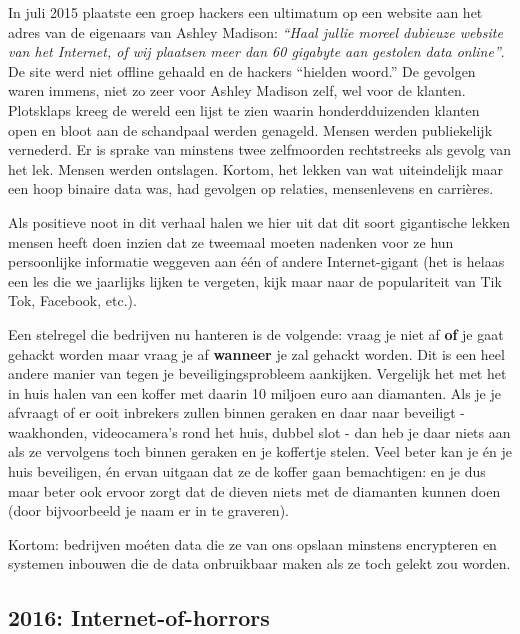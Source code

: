 \documentclass[
  10pt,
  dutch,
  paper=a4,
  ,captions=tableheading
]{scrbook}
\begin{document}
In juli 2015 plaatste een groep hackers een ultimatum op een website aan
het adres van de eigenaars van Ashley Madison: \emph{``Haal jullie
moreel dubieuze website van het Internet, of wij plaatsen meer dan 60
gigabyte aan gestolen data online''}. De site werd niet offline gehaald
en de hackers ``hielden woord.'' De gevolgen waren immens, niet zo zeer
voor Ashley Madison zelf, wel voor de klanten. Plotsklaps kreeg de
wereld een lijst te zien waarin honderdduizenden klanten open en bloot
aan de schandpaal werden genageld. Mensen werden publiekelijk vernederd.
Er is sprake van minstens twee zelfmoorden rechtstreeks als gevolg van
het lek. Mensen werden ontslagen. Kortom, het lekken van wat
uiteindelijk maar een hoop binaire data was, had gevolgen op relaties,
mensenlevens en carrières.

Als positieve noot in dit verhaal halen we hier uit dat dit soort
gigantische lekken mensen heeft doen inzien dat ze tweemaal moeten
nadenken voor ze hun persoonlijke informatie weggeven aan één of andere
Internet-gigant (het is helaas een les die we jaarlijks lijken te
vergeten, kijk maar naar de populariteit van Tik Tok, Facebook, etc.).

\begin{cautionblock}
Een stelregel die bedrijven nu hanteren is de volgende: vraag je niet af
\textbf{of} je gaat gehackt worden maar vraag je af \textbf{wanneer} je
zal gehackt worden. Dit is een heel andere manier van tegen je
beveiligingsprobleem aankijken. Vergelijk het met het in huis halen van
een koffer met daarin 10 miljoen euro aan diamanten. Als je je afvraagt
of er ooit inbrekers zullen binnen geraken en daar naar beveiligt -
waakhonden, videocamera's rond het huis, dubbel slot - dan heb je daar
niets aan als ze vervolgens toch binnen geraken en je koffertje stelen.
Veel beter kan je én je huis beveiligen, én ervan uitgaan dat ze de
koffer gaan bemachtigen: en je dus maar beter ook ervoor zorgt dat de
dieven niets met de diamanten kunnen doen (door bijvoorbeeld je naam er
in te graveren).

Kortom: bedrijven moéten data die ze van ons opslaan minstens
encrypteren en systemen inbouwen die de data onbruikbaar maken als ze
toch gelekt zou worden.
\end{cautionblock}

\subsection{2016: Internet-of-horrors}\label{internet-of-horrors}
\end{document}
